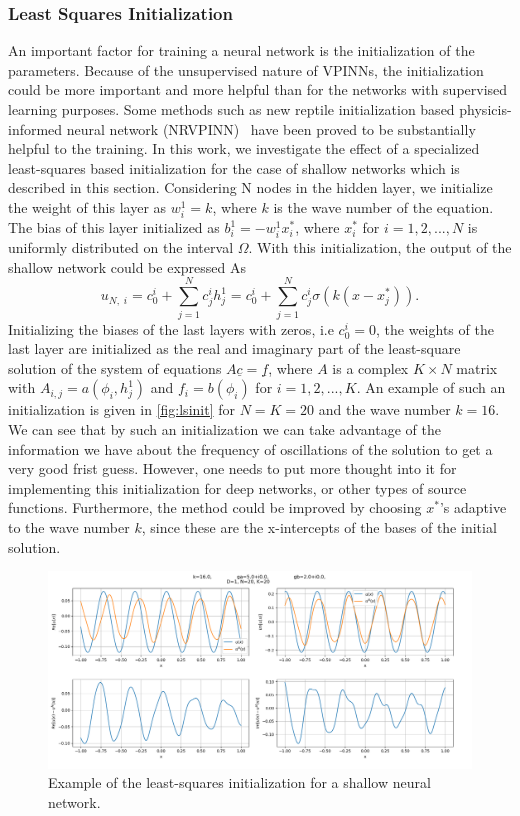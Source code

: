 \subsubsection{Least Squares Initialization}\label{sec:lsinit}
An important factor for training a neural network is the initialization of the parameters. Because of the unsupervised nature of VPINNs, the initialization could be more important and more helpful than for the networks with supervised learning purposes. Some methods such as new reptile initialization based physicis-informed neural network (NRVPINN)~\cite{liu2021init} have been proved to be substantially helpful to the training. In this work, we investigate the effect of a specialized least-squares based initialization for the case of shallow networks which is described in this section. Considering N nodes in the hidden layer, we initialize the weight of this layer as $w^{1}_{i} = k$, where $k$ is the wave number of the equation. The bias of this layer initialized as $b^{1}_{i} = -w^{1}_{i} x^{*}_{i}$, where $x^{*}_{i}$ for $i=1,2,...,N$ is uniformly distributed on the interval $\Omega$. With this initialization, the output of the shallow network could be expressed As
\begin{equation}
    u_{N,\;i} = c_0^i + \sum_{j=1}^{N}{c_j^i h^1_j} = c_0^i + \sum_{j=1}^{N}{c_j^i \sigma(k(x-x^{*}_j))}.
\end{equation}
Initializing the biases of the last layers with zeros, i.e $c_0^i = 0$, the weights of the last layer are initialized as the real and imaginary part of the least-square solution of the system of equations $A\underline{c}=\underline{f}$, where $A$ is a complex $K \times N$ matrix with $A_{i, j}=a(\phi_i, h^1_j)$ and $f_i = b(\phi_i)$ for $i=1,2,...,K$. An example of such an initialization is given in \autoref{fig:lsinit} for $N=K=20$ and the wave number $k=16$. We can see that by such an initialization we can take advantage of the information we have about the frequency of oscillations of the solution to get a very good frist guess. However, one needs to put more thought into it for implementing this initialization for deep networks, or other types of source functions. Furthermore, the method could be improved by choosing $x^{*}$'s adaptive to the wave number $k$, since these are the x-intercepts of the bases of the initial solution.

\begin{figure}[h!]
    \centering
    \includegraphics[width=.7\textwidth]{img/VPINN-lsinit.png}
    \caption{Example of the least-squares initialization for a shallow neural network.}
    \label{fig:lsinit}
\end{figure}

